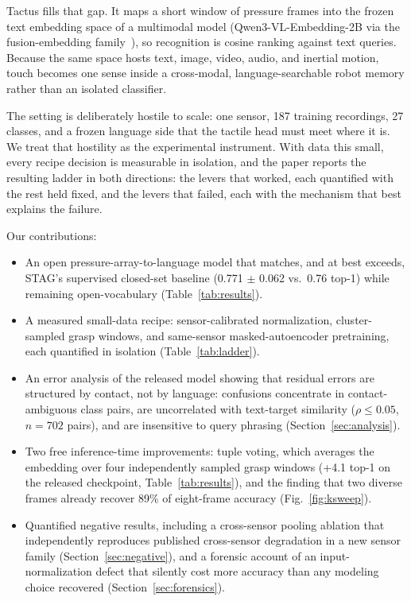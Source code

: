 \documentclass[conference]{IEEEtran}
\begin{document}
Tactus fills that gap. It maps a short window of pressure frames into the frozen text
embedding space of a multimodal model (Qwen3-VL-Embedding-2B via the fusion-embedding
family~\cite{tonmoy2026fusion}), so recognition is cosine ranking against text queries.
Because the same space hosts text, image, video, audio, and inertial motion, touch becomes
one sense inside a cross-modal, language-searchable robot memory rather than an isolated
classifier.

The setting is deliberately hostile to scale: one sensor, 187 training recordings, 27
classes, and a frozen language side that the tactile head must meet where it is. We treat
that hostility as the experimental instrument. With data this small, every recipe decision
is measurable in isolation, and the paper reports the resulting ladder in both directions:
the levers that worked, each quantified with the rest held fixed, and the levers that
failed, each with the mechanism that best explains the failure.

Our contributions:
\begin{itemize}
\item An open pressure-array-to-language model that matches, and at best exceeds, STAG's
supervised closed-set baseline (0.771 $\pm$ 0.062 vs.\ 0.76 top-1) while remaining
open-vocabulary (Table~\ref{tab:results}).
\item A measured small-data recipe: sensor-calibrated normalization, cluster-sampled grasp
windows, and same-sensor masked-autoencoder pretraining, each quantified in isolation
(Table~\ref{tab:ladder}).
\item An error analysis of the released model showing that residual errors are structured
by contact, not by language: confusions concentrate in contact-ambiguous class pairs, are
uncorrelated with text-target similarity ($\rho \le 0.05$, $n{=}702$ pairs), and are
insensitive to query phrasing (Section~\ref{sec:analysis}).
\item Two free inference-time improvements: tuple voting, which averages the embedding
over four independently sampled grasp windows (+4.1 top-1 on the released checkpoint,
Table~\ref{tab:results}), and the finding that two diverse frames already recover 89\% of
eight-frame accuracy (Fig.~\ref{fig:ksweep}).
\item Quantified negative results, including a cross-sensor pooling ablation that
independently reproduces published cross-sensor degradation in a new sensor family
(Section~\ref{sec:negative}), and a forensic account of an input-normalization defect that
silently cost more accuracy than any modeling choice recovered
(Section~\ref{sec:forensics}).
\end{itemize}
\end{document}
